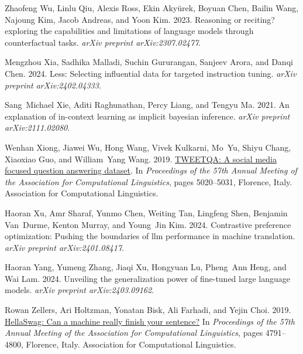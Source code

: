 \documentclass[11pt]{article}
\begin{document}
\begin{thebibliography}{88}
    Zhaofeng Wu, Linlu Qiu, Alexis Ross, Ekin Aky{\"u}rek, Boyuan Chen, Bailin Wang, Najoung Kim, Jacob Andreas, and Yoon Kim. 2023.
    \newblock Reasoning or reciting? exploring the capabilities and limitations of language models through counterfactual tasks.
    \newblock \emph{arXiv preprint arXiv:2307.02477}.
    
    Mengzhou Xia, Sadhika Malladi, Suchin Gururangan, Sanjeev Arora, and Danqi Chen. 2024.
    \newblock Less: Selecting influential data for targeted instruction tuning.
    \newblock \emph{arXiv preprint arXiv:2402.04333}.
    
    Sang~Michael Xie, Aditi Raghunathan, Percy Liang, and Tengyu Ma. 2021.
    \newblock An explanation of in-context learning as implicit bayesian inference.
    \newblock \emph{arXiv preprint arXiv:2111.02080}.
    
    Wenhan Xiong, Jiawei Wu, Hong Wang, Vivek Kulkarni, Mo~Yu, Shiyu Chang, Xiaoxiao Guo, and William~Yang Wang. 2019.
    \newblock \href {https://doi.org/10.18653/v1/P19-1496} {{TWEETQA}: A social media focused question answering dataset}.
    \newblock In \emph{Proceedings of the 57th Annual Meeting of the Association for Computational Linguistics}, pages 5020--5031, Florence, Italy. Association for Computational Linguistics.
    
    Haoran Xu, Amr Sharaf, Yunmo Chen, Weiting Tan, Lingfeng Shen, Benjamin Van~Durme, Kenton Murray, and Young~Jin Kim. 2024.
    \newblock Contrastive preference optimization: Pushing the boundaries of llm performance in machine translation.
    \newblock \emph{arXiv preprint arXiv:2401.08417}.
    
    Haoran Yang, Yumeng Zhang, Jiaqi Xu, Hongyuan Lu, Pheng~Ann Heng, and Wai Lam. 2024.
    \newblock Unveiling the generalization power of fine-tuned large language models.
    \newblock \emph{arXiv preprint arXiv:2403.09162}.
    
    Rowan Zellers, Ari Holtzman, Yonatan Bisk, Ali Farhadi, and Yejin Choi. 2019.
    \newblock \href {https://doi.org/10.18653/v1/P19-1472} {{H}ella{S}wag: Can a machine really finish your sentence?}
    \newblock In \emph{Proceedings of the 57th Annual Meeting of the Association for Computational Linguistics}, pages 4791--4800, Florence, Italy. Association for Computational Linguistics.
    

\end{thebibliography}
\end{document}

